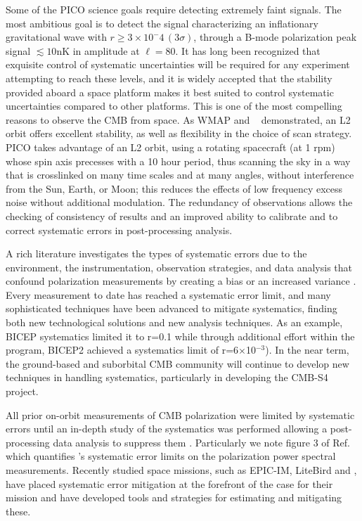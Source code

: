 \documentclass[PICOReport.tex]{subfiles}
\begin{document}
Some of the PICO science goals require detecting extremely faint signals. The most ambitious goal is to detect the  
signal characterizing an inflationary gravitational wave with $r \geq 3\times{10^-4} \, (3\sigma) $, through a B-mode polarization peak signal $\lesssim10$nK in amplitude at $\ell=80$.
It has long been recognized that exquisite control of systematic uncertainties will be required for any experiment attempting 
to reach these levels, and it is widely accepted that the stability provided aboard a space platform makes it best suited to
control systematic uncertainties compared to other platforms. This is one of the most compelling reasons to observe the 
CMB from space.  As WMAP and \planck~ demonstrated, an L2 orbit offers excellent stability, as well 
as flexibility in the choice of scan strategy.  
PICO takes advantage of an L2 orbit, using a rotating spacecraft (at 1 rpm) whose spin axis precesses with a 10 hour period, thus scanning the sky in a way that is crosslinked on many time scales and at many angles, without interference from the Sun, Earth, or Moon; this reduces the effects of low frequency excess noise without additional modulation. 
The redundancy of observations allows the checking of consistency of results and an improved ability to calibrate and to correct systematic errors in post-processing analysis.

A rich literature investigates the types of systematic errors due to the environment, the instrumentation, observation strategies, and data analysis that confound polarization measurements by creating a bias or an increased variance \cite{hu03,shimon2008,yadav2010}. 
Every measurement to date has  reached a systematic error limit, and many sophisticated techniques have been advanced to mitigate systematics, finding both new technological solutions and new analysis techniques.
As an example, BICEP systematics limited it to r=0.1\cite{Takahashi2010} while through additional effort within the program, BICEP2 achieved a systematics limit of r=6$\times$10$^{-3}$\cite{BICEP2_III}).
In the near term, the ground-based and suborbital CMB community will continue to develop new techniques in handling systematics, particularly in developing the CMB-S4 project.

All prior on-orbit measurements of CMB polarization were limited by systematic errors until an in-depth study of the systematics was performed allowing a post-processing data analysis to suppress them \cite{Bennett13,planck2016_xlvi,Planck2018_I}. 
Particularly we note figure 3 of Ref.\cite{Planck2018_I} which quantifies \planck's systematic error limits on the polarization power spectral measurements.
Recently studied space missions, such as EPIC-IM, LiteBird and  \core, have placed
systematic error mitigation at the forefront of the case for their
mission and have developed tools and strategies for estimating and mitigating these\cite{hazumi2012,wallis2017,Natoli2018}.
\end{document}

